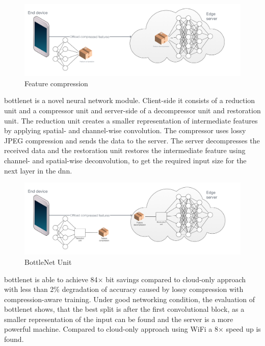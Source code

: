 \begin{figure}
	\centering
	\includegraphics[width=\linewidth]{figures/models/compressed}
	\caption[Feature compression]{Feature compression}
\end{figure}

\gls{bottlenet} \cite{eshratifar_bottlenet:_2019} is a novel neural network module. Client-side it consists of a reduction unit and a compressor unit and server-side of a decompressor unit and restoration unit. The reduction unit creates a smaller representation of intermediate features by applying spatial- and channel-wise convolution. The compressor uses lossy JPEG compression and sends the data to the server. The server decompresses the received data and the restoration unit restores the intermediate feature using channel- and spatial-wise deconvolution, to get the required input size for the next layer in the \gls{dnn}.

\begin{figure}
	\centering
	\includegraphics[width=\linewidth]{figures/models/bottlenet}
	\caption[BottleNet Unit]{BottleNet Unit}
\end{figure}

\gls{bottlenet} is able to achieve 84$\times$ bit savings compared to cloud-only approach with less than 2\% degradation of accuracy caused by lossy compression with compression-aware training. Under good networking condition, the evaluation of \gls{bottlenet} shows, that the best split is after the first convolutional block, as a smaller representation of the input can be found and the server is a more powerful machine. Compared to cloud-only approach using WiFi a 8$\times$ speed up is found.

